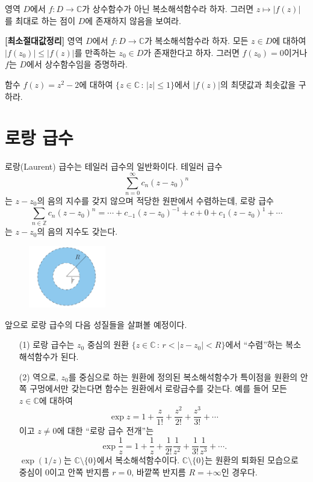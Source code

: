 \begin{salt_exercise} \label{ex-4-26}
영역 $D$에서 $f:D\to \mathbb C$가 상수함수가 아닌 복소해석함수라 하자.
그러면 $z\mapsto |f(z)|$를 최대로 하는 점이 $D$에 존재하지 않음을 보여라.
\end{salt_exercise}

\begin{salt_exercise} \textbf{[최소절대값정리]} \label{ex-4-27}
영역 $D$에서 $f:D\to \mathbb C$가 복소해석함수라 하자.
모든 $z\in D$에 대하여 $|f(z_0)| \le |f(z)|$를 만족하는 $z_0\in D$가 존재한다고 하자.
그러면 $f(z_0)=0$이거나 $f$는 $D$에서 상수함수임을 증명하라.
\end{salt_exercise}

\begin{salt_exercise} \label{ex-4-28}
함수 $f(z)=z^2-2$에 대하여
$\{z\in\mathbb C \,:\, |z|\le 1\}$에서 $|f(z)|$의 최댓값과 최솟값을 구하라.
\end{salt_exercise}

\section{로랑 급수}

로랑(Laurent) 급수는 테일러 급수의 일반화이다. 
테일러 급수
\[
\sum_{n=0}^\infty c_n(z-z_0)^n
\]
는 $z-z_0$의 음의 지수를 갖지 않으며 적당한 원판에서 수렴하는데,
로랑 급수
\[
\sum_{n\in \mathbb Z} c_n(z-z_0)^n
= \cdots + c_{-1}(z-z_0)^{-1} + c+0 + c_1(z-z_0)^1 + \cdots
\]
는 $z-z_0$의 음의 지수도 갖는다.

\begin{figure}[h!]
\begin{center}
\includegraphics[width=0.3\textwidth]{./SaltChapter/figs/fig-4-0-7}
\end{center}
\end{figure}

앞으로 로랑 급수의 다음 성질들을 살펴볼 예정이다.
\begin{itemize}
\item[(1)] 로랑 급수는 $z_0$ 중심의 
원환 $\{ z\in \mathbb C \,:\, r < |z-z_0| <R\}$에서 ``수렴''하는
복소해석함수가 된다.
\item[(2)] 역으로, $z_0$를 중심으로 하는 원환에 정의된 복소해석함수가
특이점을 원환의 안쪽 구멍에서만 갖는다면
함수는 원환에서 로랑급수를 갖는다. 예를 들어 모든 $z\in \mathbb C$에 대하여
\[
\exp z = 1 + \dfrac{z}{1!} + \dfrac{z^2}{2!} + \dfrac{z^3}{3!} + \cdots
\]
이고 $z\ne0$에 대한 ``로랑 급수 전개''는
\[
\exp \dfrac1z = 1 + \dfrac{1}{z} + \dfrac{1}{2!}\dfrac1{z^2} + \dfrac{1}{3!}\dfrac1{z^3} + \cdots.
\]
$\exp(1/z)$는 $\mathbb C\setminus \{0\}$에서 복소해석함수이다.
$\mathbb C\setminus \{0\}$는 원환의 퇴화된 모습으로
중심이 $0$이고 안쪽 반지름 $r=0$, 바깥쪽 반지름 $R=+\infty$인 경우다.
\end{itemize}


